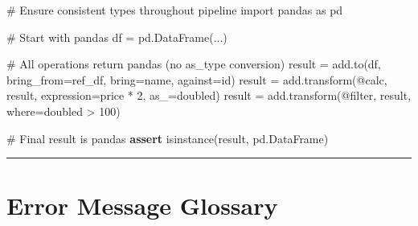\documentclass[
  letterpaper,
]{scrbook}
\newenvironment{Shaded}{\begin{snugshade}}{\end{snugshade}}
\newcommand{\BuiltInTok}[1]{\textcolor[rgb]{0.00,0.23,0.31}{#1}}
\newcommand{\CommentTok}[1]{\textcolor[rgb]{0.37,0.37,0.37}{#1}}
\newcommand{\ControlFlowTok}[1]{\textcolor[rgb]{0.00,0.23,0.31}{\textbf{#1}}}
\newcommand{\ImportTok}[1]{\textcolor[rgb]{0.00,0.46,0.62}{#1}}
\newcommand{\NormalTok}[1]{\textcolor[rgb]{0.00,0.23,0.31}{#1}}
\newcommand{\OperatorTok}[1]{\textcolor[rgb]{0.37,0.37,0.37}{#1}}
\newcommand{\StringTok}[1]{\textcolor[rgb]{0.13,0.47,0.30}{#1}}
\begin{document}
\begin{Shaded}
\begin{Highlighting}[]
\CommentTok{\# Ensure consistent types throughout pipeline}
\ImportTok{import}\NormalTok{ pandas }\ImportTok{as}\NormalTok{ pd}

\CommentTok{\# Start with pandas}
\NormalTok{df }\OperatorTok{=}\NormalTok{ pd.DataFrame(...)}

\CommentTok{\# All operations return pandas (no as\_type conversion)}
\NormalTok{result }\OperatorTok{=}\NormalTok{ add.to(df, bring\_from}\OperatorTok{=}\NormalTok{ref\_df, bring}\OperatorTok{=}\StringTok{\textquotesingle{}name\textquotesingle{}}\NormalTok{, against}\OperatorTok{=}\StringTok{\textquotesingle{}id\textquotesingle{}}\NormalTok{)}
\NormalTok{result }\OperatorTok{=}\NormalTok{ add.transform(}\StringTok{\textquotesingle{}@calc\textquotesingle{}}\NormalTok{, result, expression}\OperatorTok{=}\StringTok{\textquotesingle{}price * 2\textquotesingle{}}\NormalTok{, as\_}\OperatorTok{=}\StringTok{\textquotesingle{}doubled\textquotesingle{}}\NormalTok{)}
\NormalTok{result }\OperatorTok{=}\NormalTok{ add.transform(}\StringTok{\textquotesingle{}@filter\textquotesingle{}}\NormalTok{, result, where}\OperatorTok{=}\StringTok{\textquotesingle{}doubled \textgreater{} 100\textquotesingle{}}\NormalTok{)}

\CommentTok{\# Final result is pandas}
\ControlFlowTok{assert} \BuiltInTok{isinstance}\NormalTok{(result, pd.DataFrame)}
\end{Highlighting}
\end{Shaded}

\begin{center}\rule{0.5\linewidth}{0.5pt}\end{center}

\section{Error Message Glossary}\label{error-message-glossary}
\end{document}
